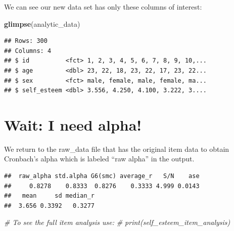 \documentclass[
]{krantz}
\makeatletter
\newenvironment{Shaded}{\begin{snugshade}}{\end{snugshade}}
\newcommand{\CommentTok}[1]{\textcolor[rgb]{0.37,0.37,0.37}{\textit{#1}}}
\newcommand{\KeywordTok}[1]{\textcolor[rgb]{0.27,0.27,0.27}{\textbf{#1}}}
\newcommand{\NormalTok}[1]{#1}
\newcommand{\OperatorTok}[1]{\textcolor[rgb]{0.43,0.43,0.43}{\textbf{#1}}}
\newcommand{\StringTok}[1]{\textcolor[rgb]{0.5,0.5,0.5}{#1}}
\newenvironment{kframe}{%
\medskip{}
\setlength{\fboxsep}{.8em}
 \def\at@end@of@kframe{}%
 \ifinner\ifhmode%
  \def\at@end@of@kframe{\end{minipage}}%
  \begin{minipage}{\columnwidth}%
 \fi\fi%
 \def\FrameCommand##1{\hskip\@totalleftmargin \hskip-\fboxsep
 \colorbox{shadecolor}{##1}\hskip-\fboxsep
     \hskip-\linewidth \hskip-\@totalleftmargin \hskip\columnwidth}%
 \MakeFramed {\advance\hsize-\width
   \@totalleftmargin\z@ \linewidth\hsize
   \@setminipage}}%
 {\par\unskip\endMakeFramed%
 \at@end@of@kframe}
\renewenvironment{Shaded}{\begin{kframe}}{\end{kframe}}
\makeatother
\begin{document}
We can see our new data set has only these columns of interest:

\begin{Shaded}
\begin{Highlighting}[]
\KeywordTok{glimpse}\NormalTok{(analytic_data)}
\end{Highlighting}
\end{Shaded}

\begin{verbatim}
## Rows: 300
## Columns: 4
## $ id          <fct> 1, 2, 3, 4, 5, 6, 7, 8, 9, 10,...
## $ age         <dbl> 23, 22, 18, 23, 22, 17, 23, 22...
## $ sex         <fct> male, female, male, female, ma...
## $ self_esteem <dbl> 3.556, 4.250, 4.100, 3.222, 3....
\end{verbatim}

\hypertarget{wait-i-need-alpha}{%
\section{Wait: I need alpha!}\label{wait-i-need-alpha}}

We return to the raw\_data file that has the original item data to obtain Cronbach's alpha which is labeled ``raw alpha'' in the output.

\begin{Shaded}
\end{Shaded}

\begin{verbatim}
##  raw_alpha std.alpha G6(smc) average_r   S/N    ase
##     0.8278    0.8333  0.8276    0.3333 4.999 0.0143
##   mean     sd median_r
##  3.656 0.3392   0.3277
\end{verbatim}

\begin{Shaded}
\begin{Highlighting}[]
\CommentTok{# To see the full item analysis use:}
\CommentTok{# print(self_esteem_item_analysis)}
\end{Highlighting}
\end{Shaded}
\end{document}
